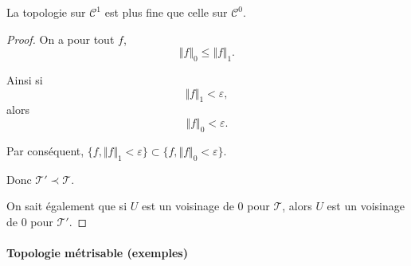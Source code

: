 \documentclass[french]{book}
\theoremstyle{definition}
\theoremstyle{remark}
\newcommand{\lesss}{<}
\newcommand{\less}{\lesss}
\begin{document}
La topologie sur $\mathcal{C}^1$ est plus fine que celle sur $\mathcal{C}^0$.

\begin{proof}
  On a pour tout $f$, $$\Vert f \Vert _{0} \leq \Vert f \Vert _{1} .$$

  Ainsi si $$\Vert f \Vert _{1} \less \varepsilon,   $$ alors $$\Vert f \Vert _{0} \less \varepsilon.  $$

  Par conséquent, $\{ f , \Vert f \Vert _{1 } \less \varepsilon  \} \subset \{ f, \Vert f \Vert _{0} \less \varepsilon   \} $.

  Donc $\mathscr{T}' \prec \mathscr{T}  $.

  On sait également que si $U$ est un voisinage de 0 pour $\mathscr{T} $, alors $U$ est un voisinage de 0 pour $\mathscr{T}' $.
\end{proof}

\paragraph{Topologie métrisable (exemples)}
\end{document}

